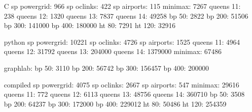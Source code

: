 C
sp powergrid: 966
sp oclinks: 422
sp airports: 115
minimax:  7267
queens 11: 238
queens 12: 1320
queens 13: 7837
queens 14: 49258
bp 50: 2822
bp 200: 51506
bp 300: 141000
bp 400: 180000
ht 80: 7291
ht 120: 32916

python
sp powergrid: 10221
sp oclinks: 4726
sp airports: 1525
queens 11: 4964
queens 12: 31792
queens 13: 204000
queens 14: 1379000
minimax: 67486

graphlab:
bp 50: 3110
bp 200: 56742
bp 300: 156457
bp 400: 200000

compiled
sp powergrid: 4075
sp oclinks: 2667
sp airports: 547
minimax: 29616
queens 11: 772
queens 12: 6113
queens 13: 48756
queens 14: 360710
bp 50: 3508
bp 200: 64237
bp 300: 172000
bp 400: 229012
ht 80: 50486
ht 120: 254359
\fi
